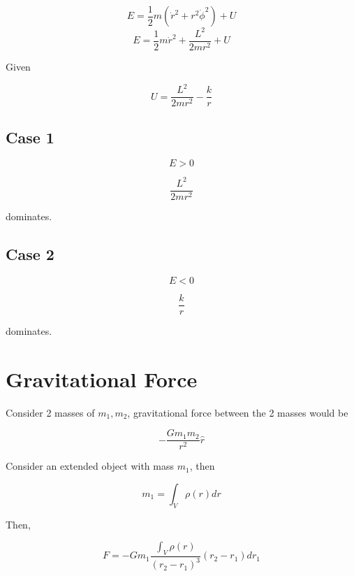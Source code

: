 \documentclass{article}
\newtheorem{one minute paper}[theorem]{One Minute Paper}
\begin{document}
\begin{equation}
    E = \frac{1}{2}m(\dot{r}^2 + r^2\dot{\phi}^2) + U
\end{equation}
\begin{equation}
    E = \frac{1}{2}m\dot{r}^2 + \frac{L^2}{2mr^2} + U
\end{equation}

Given 

\begin{equation}
    U = \frac{L^2}{2mr^2} - \frac{k}{r}
\end{equation}

\subsection*{Case 1}

\begin{equation}
    E > 0
\end{equation}

\begin{equation}
    \frac{L^2}{2mr^2}
\end{equation}

dominates. 

\subsection*{Case 2}

\begin{equation}
    E < 0
\end{equation}

\begin{equation}
    \frac{k}{r}
\end{equation}

dominates. 

\section*{Gravitational Force}

Consider 2 masses of $m_1, m_2$, gravitational force between the 2 masses would be 

\begin{equation}
    -\frac{Gm_1m_2}{r^2}\hat{r}
\end{equation}

Consider an extended object with mass $m_1$, then 

\begin{equation}
    m_1 = \int_{V}\rho(r)dr
\end{equation}

Then, 

\begin{equation}
    F = -Gm_1\frac{\int_{V}\rho(r)}{(r_2-r_1)^3}(r_2-r_1)dr_1
\end{equation}
\end{document}
